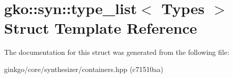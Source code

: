 \hypertarget{structgko_1_1syn_1_1type__list}{}\section{gko\+:\+:syn\+:\+:type\+\_\+list$<$ Types $>$ Struct Template Reference}
\label{structgko_1_1syn_1_1type__list}


The documentation for this struct was generated from the following file\+:\begin{DoxyCompactItemize}
\item 
ginkgo/core/synthesizer/containers.\+hpp (c71510aa)\end{DoxyCompactItemize}
